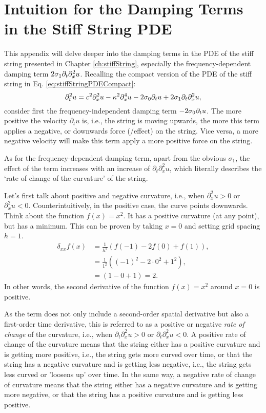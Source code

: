 \chapter{Intuition for the Damping Terms in the Stiff String PDE}\label{app:intuitionSigma1}
This appendix will delve deeper into the damping terms in the PDE of the stiff string presented in Chapter \ref{ch:stiffString}, especially the frequency-dependent damping term $2\sigma_1\partial_t\partial_x^2 u$. Recalling the compact version of the PDE of the stiff string in Eq. \eqref{eq:stiffStringPDECompact}:
\begin{equation}
    \partial_t^2 u = c^2 \partial_x^2 u - \kappa^2 \partial_x^4 u - 2 \sigma_{0} \partial_t u + 2 \sigma_{1} \partial_t \partial_x^2 u,
\end{equation}
consider first the frequency-independent damping term $-2\sigma_{0}\partial_t u$. The more positive the velocity $\partial_tu$ is, i.e., the string is moving upwards, the more this term applies a negative, or downwards force (/effect) on the string. Vice versa, a more negative velocity will make this term apply a more positive force on the string. 

As for the frequency-dependent damping term, apart from the obvious $\sigma_1$, the effect of the term increases with an increase of $\partial_t\partial_x^2u$, which literally describes the `rate of change of the curvature' of the string.

Let's first talk about positive and negative curvature, i.e., when $\partial_x^2u > 0$ or $\partial_x^2u < 0$. Counterintuitively, in the positive case, the curve points downwards. Think about the function $f(x) = x^2$. It has a positive curvature (at any point), but has a minimum. This can be proven by taking $x=0$ and setting grid spacing $h=1$.
\begin{equation}
  \begin{aligned}
  \delta_{xx}f(x) &= \frac{1}{h^2} \left(f(-1)-2f(0)+f(1)\right), \\
  &= \frac{1}{1^2} \left((-1)^2-2\cdot0^2+1^2\right),\\
  &= \left(1-0+1\right) = 2.
  \end{aligned}
\end{equation}
In other words, the second derivative of the function $f(x)=x^2$ around $x=0$ is positive.

As the term does not only include a second-order spatial derivative but also a first-order time derivative, this is referred to as a positive or negative \textit{rate of change} of the curvature, i.e., when $\partial_t\partial_x^2u>0$ or $\partial_t\partial_x^2u<0$. A positive rate of change of the curvature means that the string either has a positive curvature and is getting more positive, i.e., the string gets more curved over time, or that the string has a negative curvature and is getting less negative, i.e., the string gets less curved or 'loosens up' over time.  In the same way, a negative rate of change of curvature means that the string either has a negative curvature and is getting more negative, or that the string has a positive curvature and is getting less positive. 

